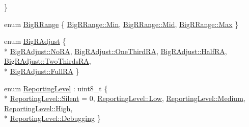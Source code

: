 \begin{DoxyCompactItemize}
 \}
\item 
enum \hyperlink{namespace_k_base_ad1033118c8842a9ee6ff4d01651a2640}{Big\-R\-Range} \{ \hyperlink{namespace_k_base_ad1033118c8842a9ee6ff4d01651a2640a78d811e98514cd165dda532286610fd2}{Big\-R\-Range\-::\-Min}, 
\hyperlink{namespace_k_base_ad1033118c8842a9ee6ff4d01651a2640a55c6b09cbca39ef0cdb728eb112a5049}{Big\-R\-Range\-::\-Mid}, 
\hyperlink{namespace_k_base_ad1033118c8842a9ee6ff4d01651a2640a6a061313d22e51e0f25b7cd4dc065233}{Big\-R\-Range\-::\-Max}
 \}
\item 
enum \hyperlink{namespace_k_base_abb184480a342df4bda049658b7a0a251}{Big\-R\-Adjust} \{ \\*
\hyperlink{namespace_k_base_abb184480a342df4bda049658b7a0a251a70485a2c3c83af1a1bf50995e185a496}{Big\-R\-Adjust\-::\-No\-R\-A}, 
\hyperlink{namespace_k_base_abb184480a342df4bda049658b7a0a251ac34f8a9b3a517b071ae184c0d544dac2}{Big\-R\-Adjust\-::\-One\-Third\-R\-A}, 
\hyperlink{namespace_k_base_abb184480a342df4bda049658b7a0a251ad707a458f9e110cc394a46aaa2d080b2}{Big\-R\-Adjust\-::\-Half\-R\-A}, 
\hyperlink{namespace_k_base_abb184480a342df4bda049658b7a0a251a7b814e96863d300955db9d990c310497}{Big\-R\-Adjust\-::\-Two\-Thirds\-R\-A}, 
\\*
\hyperlink{namespace_k_base_abb184480a342df4bda049658b7a0a251a344bbf6c431eff8ab656436cf555d686}{Big\-R\-Adjust\-::\-Full\-R\-A}
 \}
\item 
enum \hyperlink{namespace_k_base_aa0dcd758ffc6d403489fc15487ad485c}{Reporting\-Level} \-: uint8\-\_\-t \{ \\*
\hyperlink{namespace_k_base_aa0dcd758ffc6d403489fc15487ad485ca1e3332b2cd20d2d3db407a20f6913d0d}{Reporting\-Level\-::\-Silent} = 0, 
\hyperlink{namespace_k_base_aa0dcd758ffc6d403489fc15487ad485ca28d0edd045e05cf5af64e35ae0c4c6ef}{Reporting\-Level\-::\-Low}, 
\hyperlink{namespace_k_base_aa0dcd758ffc6d403489fc15487ad485ca87f8a6ab85c9ced3702b4ea641ad4bb5}{Reporting\-Level\-::\-Medium}, 
\hyperlink{namespace_k_base_aa0dcd758ffc6d403489fc15487ad485ca655d20c1ca69519ca647684edbb2db35}{Reporting\-Level\-::\-High}, 
\\*
\hyperlink{namespace_k_base_aa0dcd758ffc6d403489fc15487ad485cada7d763aac39b294c7453c77c10d8239}{Reporting\-Level\-::\-Debugging}
 \}
\end{DoxyCompactItemize}
